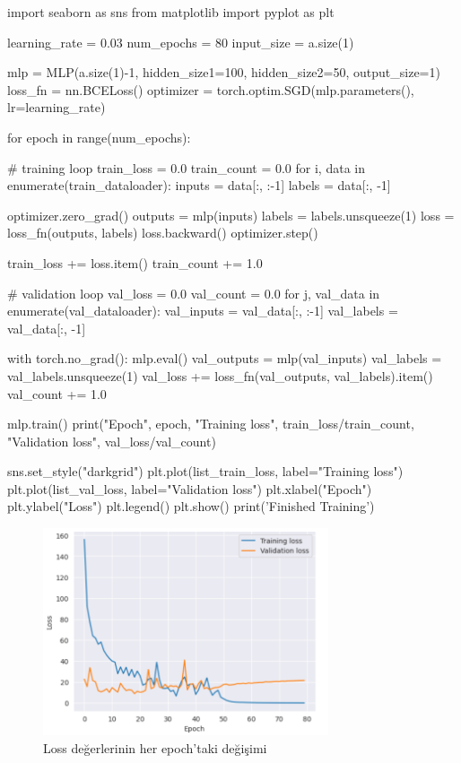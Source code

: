\documentclass[11pt]{article}
\begin{document}
\begin{python}
import seaborn as sns
from matplotlib import pyplot as plt

learning_rate = 0.03
num_epochs = 80
input_size = a.size(1)

mlp = MLP(a.size(1)-1, hidden_size1=100, hidden_size2=50, output_size=1)
loss_fn = nn.BCELoss()
optimizer = torch.optim.SGD(mlp.parameters(), lr=learning_rate)


for epoch in range(num_epochs):

    # training loop
    train_loss = 0.0
    train_count = 0.0
    for i, data in enumerate(train_dataloader):
         inputs = data[:, :-1]
         labels = data[:, -1]

         optimizer.zero_grad()
         outputs = mlp(inputs)
         labels = labels.unsqueeze(1)
         loss = loss_fn(outputs, labels)
         loss.backward()
         optimizer.step()

         train_loss += loss.item()
         train_count += 1.0
       

    # validation loop
    val_loss = 0.0
    val_count = 0.0
    for j, val_data in enumerate(val_dataloader):
        val_inputs = val_data[:, :-1]
        val_labels = val_data[:, -1]

        with torch.no_grad():
            mlp.eval()
            val_outputs = mlp(val_inputs)
            val_labels = val_labels.unsqueeze(1)
            val_loss += loss_fn(val_outputs, val_labels).item()
            val_count += 1.0

    mlp.train()
    print("Epoch", epoch, "Training loss", train_loss/train_count, "Validation loss", val_loss/val_count)


sns.set_style("darkgrid")
plt.plot(list_train_loss, label="Training loss")
plt.plot(list_val_loss, label="Validation loss")
plt.xlabel("Epoch")
plt.ylabel("Loss")
plt.legend()
plt.show()
print('Finished Training')
\end{python}


\begin{figure}[ht!]
    \centering
    \includegraphics[width=0.75\textwidth]{epoch1.png}
    \caption{Loss değerlerinin her epoch'taki değişimi}
    \label{fig:my_pic}
\end{figure}
\end{document}
